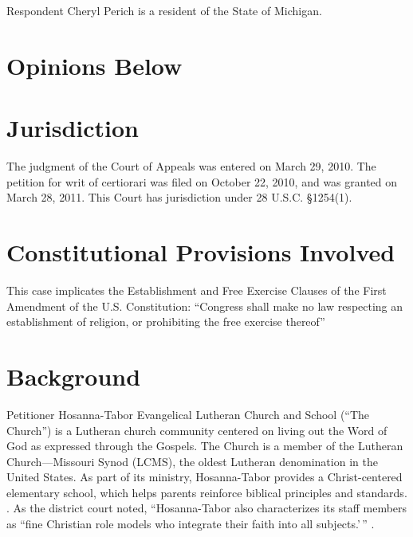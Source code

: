 \documentclass[12pt,\documentclassflag]{michiganCourtOfAppealsBrief}
\begin{document}
\noindent{}Respondent Cheryl Perich is a resident of the State of Michigan.  

\section{Opinions Below} 

\section{Jurisdiction} 
The judgment of the Court of Appeals was entered on March 29, 2010. The petition for writ of certiorari was filed on October 22, 2010, and was granted on March 28, 2011. This Court has jurisdiction under 28 U.S.C. \S 1254(1).

\section{Constitutional Provisions Involved} 
This case implicates the Establishment and Free Exercise Clauses of the First Amendment of the U.S. Constitution: ``Congress shall make no law respecting an establishment of religion, or prohibiting the free exercise thereof\ldotss'' \cite[!]{1st amendment}

\section{Background} 

Petitioner Hosanna-Tabor Evangelical Lutheran Church and School (``The Church'') is a Lutheran church community centered on living out the Word of God as expressed through the Gospels. The Church is a member of the Lutheran Church---Missouri Synod (LCMS), the oldest Lutheran denomination in the United States.  As part of its ministry, Hosanna-Tabor provides a Christ-centered elementary school, which helps parents reinforce biblical principles and standards. \See {}.  As the district court noted, ``Hosanna-Tabor also characterizes its staff members as ``fine Christian role models who integrate their faith into all subjects.'\,'' . 
\end{document}
